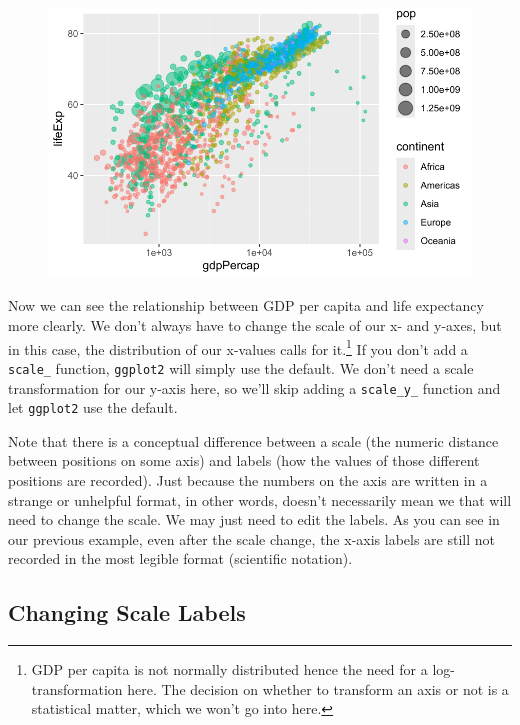 \documentclass[
  letterpaper,
]{book}
\begin{document}
\begin{figure}[H]

{\centering \includegraphics{visualizing-with-ggplot_files/figure-pdf/unnamed-chunk-23-1.pdf}

}

\end{figure}

Now we can see the relationship between GDP per capita and life
expectancy more clearly. We don't always have to change the scale of our
x- and y-axes, but in this case, the distribution of our x-values calls
for it.\footnote{GDP per capita is not normally distributed hence the
  need for a log-transformation here. The decision on whether to
  transform an axis or not is a statistical matter, which we won't go
  into here.} If you don't add a \texttt{scale\_} function,
\texttt{ggplot2} will simply use the default. We don't need a scale
transformation for our y-axis here, so we'll skip adding a
\texttt{scale\_y\_} function and let \texttt{ggplot2} use the default.

Note that there is a conceptual difference between a scale (the numeric
distance between positions on some axis) and labels (how the values of
those different positions are recorded). Just because the numbers on the
axis are written in a strange or unhelpful format, in other words,
doesn't necessarily mean we that will need to change the scale. We may
just need to edit the labels. As you can see in our previous example,
even after the scale change, the x-axis labels are still not recorded in
the most legible format (scientific notation).

\hypertarget{changing-scale-labels}{%
\subsection{Changing Scale Labels}\label{changing-scale-labels}}
\end{document}
